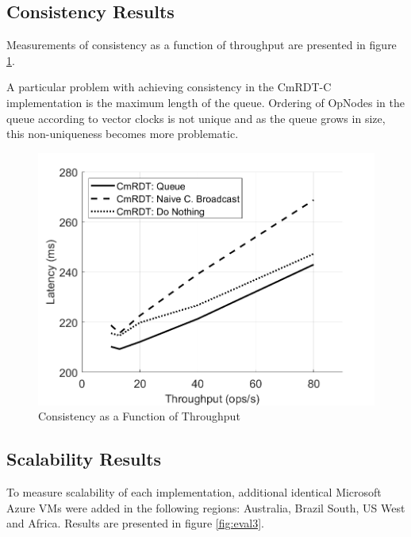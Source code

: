\documentclass[sigconf,nonacm,11pt]{acmart}
\begin{document}
\subsection{Consistency Results}
Measurements of consistency as a function of throughput are presented in figure \ref{fig:eval2}. 

A particular problem with achieving consistency in the CmRDT-C implementation is the maximum length of the queue. Ordering of OpNodes in the queue according to vector clocks is not unique and as the queue grows in size, this non-uniqueness becomes more problematic.

\begin{figure}[h]
  \centering
  \includegraphics[width=\linewidth]{Fig8Eval2}
  \caption{Consistency as a Function of Throughput}
  \label{fig:eval2}
\end{figure}

\subsection{Scalability Results}
To measure scalability of each implementation, additional identical Microsoft Azure VMs were added in the following regions: Australia, Brazil South, US West and Africa. Results are presented in figure \ref{fig:eval3}.
\end{document}
